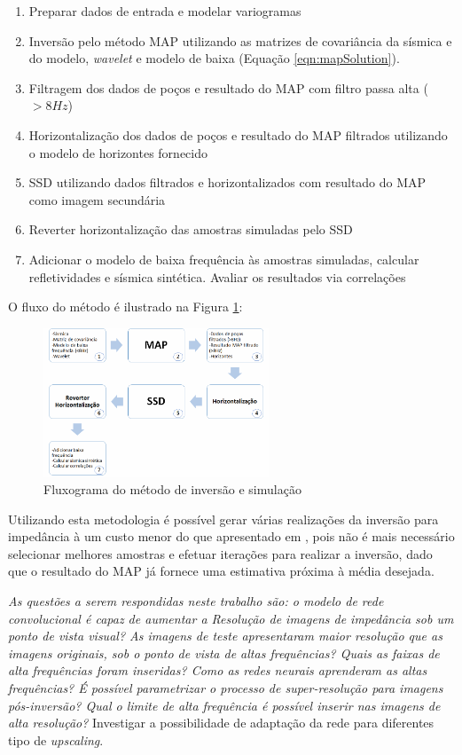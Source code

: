 \begin{enumerate}
  \item Preparar dados de entrada e modelar variogramas
  \item Inversão pelo método MAP utilizando as matrizes de covariância da
  sísmica e do modelo, \textit{wavelet} e modelo de baixa (Equação
  \ref{eqn:mapSolution}).
  \item Filtragem dos dados de poços e resultado do MAP com filtro passa alta
  ($>8Hz$)
  \item Horizontalização dos dados de poços e resultado do MAP filtrados
  utilizando o modelo de horizontes fornecido
  \item SSD utilizando dados filtrados e horizontalizados com resultado do MAP
  como imagem secundária
  \item Reverter horizontalização das amostras simuladas pelo SSD
  \item Adicionar o modelo de baixa frequência às amostras simuladas, calcular
  refletividades e sísmica sintética. Avaliar os resultados via correlações
\end{enumerate}

O fluxo do método é ilustrado na Figura \ref{fig:fluxo}:

\begin{figure}[htp]
\begin{center}
  \includegraphics[width=0.6\textwidth]{fig/fluxo}
  \caption{Fluxograma do método de inversão e simulação}
  \label{fig:fluxo}
\end{center}
\end{figure}

Utilizando esta metodologia é possível gerar várias realizações da inversão para
impedância à um custo menor do que apresentado em \citep{amilcarInversao}, pois
não é mais necessário selecionar melhores amostras e efetuar iterações para
realizar a inversão, dado que o resultado do MAP já fornece uma estimativa
próxima à média desejada.

\textit{ As questões a serem respondidas neste trabalho são: o modelo de rede convolucional é capaz de aumentar a Resolução de imagens de impedância
sob um ponto de vista visual? As imagens de teste apresentaram maior resolução que as imagens originais, sob o ponto 
de vista de altas frequências? Quais as faixas de alta frequências foram inseridas? Como as redes neurais aprenderam
as altas frequências? É possível parametrizar o processo de super-resolução para imagens pós-inversão?
Qual o limite de alta frequência é possível inserir nas imagens de alta resolução?}
Investigar a possibilidade de adaptação da rede para diferentes tipo de \textit{upscaling}.

